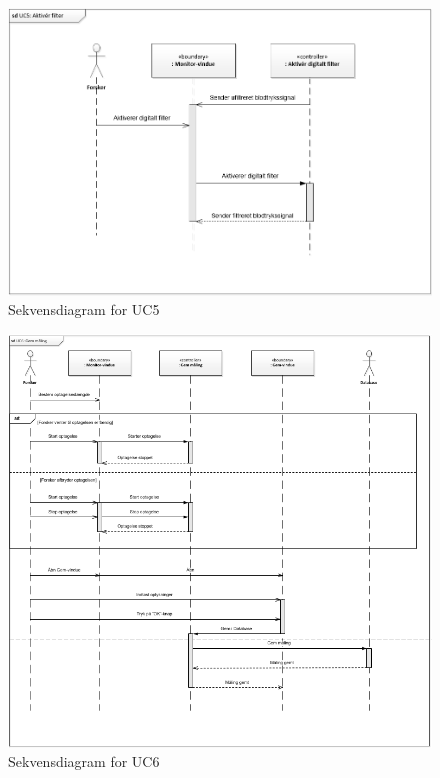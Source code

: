 \begin{figure}[H]
	\centering
	\includegraphics[width=1\textwidth]{Figurer/UC5_SD}
	\caption{Sekvensdiagram for UC5}
\end{figure}

\begin{figure}[H]
	\centering
	\includegraphics[width=1\textwidth]{Figurer/UC6_SD}
	\caption{Sekvensdiagram for UC6}
\end{figure}

